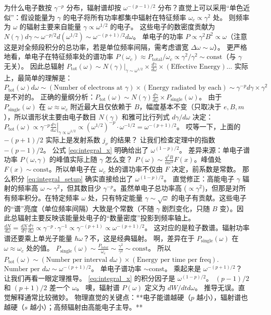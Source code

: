 为什么电子数按 $\gamma^{-p}$ 分布，辐射谱却按 $\omega^{-(p-1)/2}$ 分布？直觉上可以采用“单色近似”：假设能量为 $\gamma$ 的电子将所有功率都集中辐射在特征频率 $\omega_c \propto \gamma^2$ 处。
则频率为 $\omega$ 的辐射主要来自能量 $\gamma \propto \omega^{1/2}$ 的电子。
这些电子的数密度贡献为 $N(\gamma)d\gamma \sim \omega^{-p/2} d(\omega^{1/2}) \sim \omega^{-(p+1)/2} d\omega$。
单电子的功率 $P \propto \gamma^2 B^2 \propto \omega$（注意这是对全频段积分的总功率，若是单位频率间隔，需考虑谱宽 $\Delta \omega \sim \omega$）。
更严格地看，单电子在特征频率处的谱功率 $P(\omega_c) \approx P_{\text{total}} / \omega_c \propto \gamma^2 / \gamma^2 \sim \text{const}$（与 $\gamma$ 无关）。
因此总辐射 $P_{\text{tot}}(\omega) \sim N(\gamma)|_{\gamma \sim \omega^{1/2}} \times \frac{d\gamma}{d\omega} \times (\text{Effective Energy}) \dots$
实际上，最简单的理解是：$P_{\text{tot}}(\omega) d\omega \sim (\text{Number of electrons at } \gamma) \times (\text{Energy radiated by each}) \sim \gamma^{-p} d\gamma \times \gamma^2$ 是不对的。
正确的量纲分析：$P_{\text{tot}}(\omega) \sim N(\gamma) \frac{d\gamma}{d\omega} \times P_{\text{single}}(\omega)$。
由于 $P_{\text{single}}(\omega)$ 在 $\omega \approx \omega_c$ 附近最大且仅依赖于 $B$，幅度基本不变（只取决于 $e, B, m$），所以谱形状主要由电子数目 $N(\gamma)$ 和雅可比行列式 $d\gamma/d\omega$ 决定：
$P_{\text{tot}}(\omega) \propto \left. \gamma^{-p} \frac{d\gamma}{d\omega} \right|_{\gamma \propto \omega^{1/2}} \propto (\omega^{1/2})^{-p} \cdot \omega^{-1/2} = \omega^{-(p+1)/2}$。
哎等一下，上面的 $-(p+1)/2$ 实际上是发射系数 $j_\nu$ 的结果？
让我们检查定理中的指数 $-(p-1)/2$。
公式 \eqref{eq:integral_x} 明确给出了 $\omega^{(1-p)/2}$。
差异来源：单电子谱功率 $P(\omega, \gamma)$ 的峰值实际上随 $\gamma$ 怎么变？
$P(\omega) \sim \frac{q^3 B}{m c^2} F(x)$。峰值处 $F(x) \sim \text{const}$。所以单电子在 $\omega_c$ 处的谱功率不仅由 $F$ 决定，前系数是常数。
那么积分 \eqref{eq:integral_setup} 确实直接给出了 $\omega^{(1-p)/2}$。
直觉修正：高能电子 $\gamma$ 辐射的频率高 $\omega \sim \gamma^2$，但其数目少 $\gamma^{-p}$。虽然单电子总功率高 ($\propto \gamma^2$)，但那是对所有频率积分。在特定频率 $\omega$ 处，只有特定能量 $\gamma \sim \sqrt{\omega}$ 的电子有贡献。这些电子的“谱”亮度（单位频率间隔）大致是个常数（不随 $\gamma$ 剧烈变化，只随 $B$ 变）。因此总辐射主要反映该能量处电子的“数量密度”投影到频率轴上。
$\frac{dN}{d\omega} = \frac{dN}{d\gamma} \frac{d\gamma}{d\omega} \propto \gamma^{-p} \cdot \gamma^{-1} \propto \gamma^{-(p+1)} \propto \omega^{-(p+1)/2}$。
这对应的是粒子数谱。辐射功率谱还要乘上单光子能量 $\hbar \omega$？不，这是经典辐射。
啊，差异在于 $P_{\text{single}}(\omega)$ 在 $\omega \approx \omega_c$ 处的值。
$P_{\text{single}}(\omega) \sim \frac{P_{total}}{\omega_c} \sim \frac{\gamma^2}{\gamma^2} \sim \text{const}$。
所以 $P_{\text{tot}}(\omega) \sim (\text{Number per interval } d\omega) \times (\text{Energy per time per freq})$.
$\text{Number per } d\omega \sim \omega^{-(p+1)/2}$。
单电子谱功率 $\sim \text{const}$。
乘起来是 $\omega^{-(p+1)/2}$？
让我们再看一眼定理推导。 \eqref{eq:integral_x} 的积分因子是 $\omega^{(1-p)/2}$。
$(p-1)/2$ 和 $(p+1)/2$ 差一个 $\omega$。
噢，辐射谱 $P(\omega)$ 定义为 $dW/dtd\omega$。
推导无误。直觉解释通常比较微妙。
物理直觉的关键点：**电子能谱越硬（$p$ 越小），辐射谱也越硬（$s$ 越小）；高频辐射由高能电子主导。**



